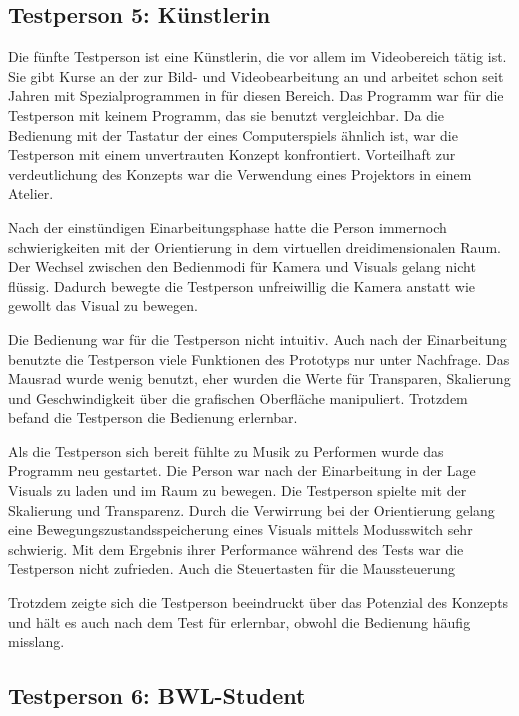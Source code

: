\subsection{Testperson 5: K\"unstlerin}

Die f\"unfte Testperson ist eine K\"unstlerin, die vor allem im Videobereich t\"atig ist. Sie gibt Kurse an der zur Bild- und Videobearbeitung an
und arbeitet schon seit Jahren mit Spezialprogrammen in f\"ur diesen Bereich. Das Programm war f\"ur die Testperson mit keinem Programm,
das sie benutzt vergleichbar. Da die Bedienung mit der Tastatur der eines Computerspiels \"ahnlich ist, war die Testperson mit
einem unvertrauten Konzept konfrontiert. Vorteilhaft zur verdeutlichung des Konzepts war die Verwendung eines Projektors in einem Atelier.

Nach der einst\"undigen Einarbeitungsphase hatte die Person immernoch schwierigkeiten mit der Orientierung in dem virtuellen dreidimensionalen
Raum. Der Wechsel zwischen den Bedienmodi f\"ur Kamera und Visuals gelang nicht fl\"ussig. Dadurch bewegte die Testperson unfreiwillig die Kamera
anstatt wie gewollt das Visual zu bewegen.

Die Bedienung war f\"ur die Testperson nicht intuitiv. Auch nach der Einarbeitung benutzte die Testperson viele Funktionen des Prototyps nur
unter Nachfrage. Das Mausrad wurde wenig benutzt, eher wurden die Werte f\"ur Transparen, Skalierung und Geschwindigkeit \"uber die
grafischen Oberfl\"ache manipuliert. Trotzdem befand die Testperson die Bedienung erlernbar.

Als die Testperson sich bereit f\"uhlte zu Musik zu Performen wurde das Programm neu gestartet. Die Person war nach der Einarbeitung in der
Lage Visuals zu laden und im Raum zu bewegen. Die Testperson spielte mit der Skalierung und Transparenz. Durch die Verwirrung bei der Orientierung
gelang eine Bewegungszustandsspeicherung eines Visuals mittels Modusswitch sehr schwierig. Mit dem Ergebnis ihrer Performance w\"ahrend des Tests
war die Testperson nicht zufrieden. Auch die Steuertasten f\"ur die Maussteuerung

Trotzdem zeigte sich die Testperson beeindruckt \"uber das Potenzial des Konzepts und h\"alt es auch nach dem Test f\"ur erlernbar, obwohl
die Bedienung h\"aufig misslang.

\subsection{Testperson 6: BWL-Student}

